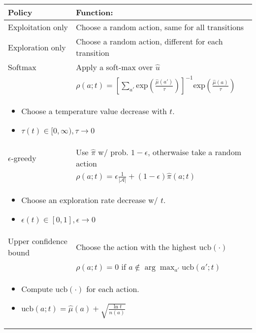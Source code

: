 \begin{summary}
    \begin{center}
        \begin{tabular}{ll}
            \toprule
            \textbf{Policy} & \textbf{Function:} \\
            \midrule
            Exploitation only & Choose a random action, same for all transitions \\
            \midrule
            Exploration only & Choose a random action, different for each transition \\ 
            \midrule
            Softmax & Apply a soft-max over $\hat{u}$ \\
            & $\rho(a;t) = \left[\sum_{a'} \text{exp}\left(\frac{\hat{\mu}(a')}{\tau}\right)\right]^{-1} \text{exp}\left(\frac{\hat{\mu}(a)}{\tau}\right)$ \\
            \multicolumn{2}{p{\linewidth}}{
            \begin{itemize}
                \item Choose a temperature value decrease with $t$. 
                \item $\tau(t) \in [0,\infty), \tau \rightarrow 0$
            \end{itemize}} \\
            \midrule
            $\epsilon$-greedy & Use $\hat{\pi}$ w/ prob. $1-\epsilon$, otherwaise take a random action \\
            & $\rho(a;t) = \epsilon \frac{1}{|\mathcal{A}|} + (1-\epsilon) \hat{\pi}(a;t)$ \\
            \multicolumn{2}{p{\linewidth}}{
            \begin{itemize}
                \item Choose an exploration rate decrease w/ $t$. 
                \item $\epsilon(t) \in [0,1], \epsilon \rightarrow 0$
            \end{itemize}} \\
            \midrule
            Upper confidence bound & Choose the action with the highest $\text{ucb}(\cdot)$\\ 
            & $\rho(a;t) = 0$ if $a \notin \arg \max_{a'} \text{ucb}(a';t)$ \\
            \multicolumn{2}{p{\linewidth}}{
            \begin{itemize}
                \item Compute $\text{ucb}(\cdot)$ for each action. 
                \item $\text{ucb}(a;t) = \hat{\mu}(a) + \sqrt{\frac{\ln t}{n(a)}}$
            \end{itemize}} \\
            \bottomrule            
        \end{tabular}
    \end{center}

\end{summary}

